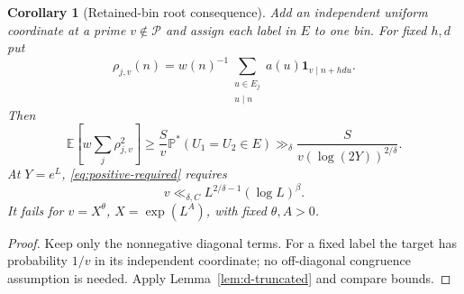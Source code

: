 \documentclass[11pt]{article}
\newtheorem{corollary}[theorem]{Corollary}
\theoremstyle{definition}
\newcommand{\E}{\mathbb E}
\newcommand{\Prob}{\mathbb P}
\newcommand{\ind}{\mathbf 1}
\theoremstyle{remark}
\numberwithin{equation}{section}
\begin{document}
\begin{corollary}[Retained-bin root consequence]\label{cor:d-truncated-root}
Add an independent uniform coordinate at a prime $v\notin\mathcal P$ and assign each label in $E$
to one bin. For fixed $h,d$ put
\begin{equation}\label{eq:d-truncated-rho}
 \rho_{j,v}(n)=w(n)^{-1}\sum_{\substack{u\in E_j\\u\mid n}}a(u)\ind_{v\mid n+hdu}.
\end{equation}
Then
\begin{equation}\label{eq:d-truncated-root}
 \E[w\sum_j\rho_{j,v}^2]\ge\frac Sv\Prob^*(U_1=U_2\in E)
 \gg_\delta\frac{S}{v(\log(2Y))^{2/\delta}}.
\end{equation}
At $Y=e^L$, \eqref{eq:positive-required} requires
\begin{equation}\label{eq:d-truncated-v}
 v\ll_{\delta,C}L^{2/\delta-1}(\log L)^\beta.
\end{equation}
It fails for $v=X^\theta$, $X=\exp(L^A)$, with fixed $\theta,A>0$.
\end{corollary}
\begin{proof}
Keep only the nonnegative diagonal terms. For a fixed label the target has probability $1/v$ in its
independent coordinate; no off-diagonal congruence assumption is needed.
Apply Lemma~\ref{lem:d-truncated} and compare bounds.
\end{proof}
\end{document}
